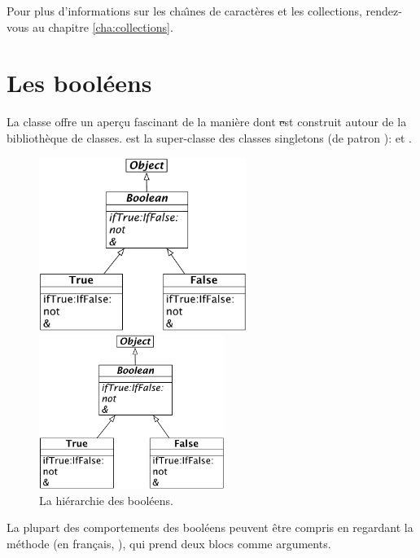\documentclass[a4paper,10pt,twoside]{book}
\begin{document}
Pour plus d'informations sur les cha\^{\i}nes de caract\`eres et les
collections, rendez-vous au chapitre \ref{cha:collections}.


\section{Les bool\'eens}

La classe  offre un aper\c{c}u fascinant de la
mani\`ere dont \st est construit autour de la biblioth\`eque de classes. 
 est la super-classe  des classes
singletons (de patron ):  et .

\begin{figure}[ht]
\ifluluelse
	{\centerline {\includegraphics[width=0.6\textwidth]{BooleanHierarchy}}}
	{\centerline {\includegraphics[width=6cm]{BooleanHierarchy}}}
\caption{La hi\'erarchie des bool\'eens.\label{fig:booleans}}
\end{figure}

La plupart des comportements des bool\'eens peuvent \^etre compris en
regardant la m\'ethode  (en
fran\c{c}ais, ), qui prend deux blocs
comme arguments.
\end{document}
